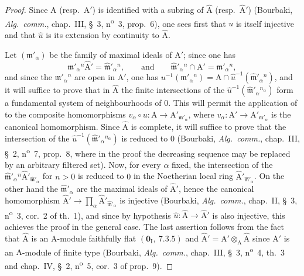 \begin{proof}
Since $\mathrm{A}$ (resp.\ $\mathrm{A}'$) is identified with a subring of $\hat{\mathrm{A}}$ (resp.\ $\hat{\mathrm{A}}'$) (Bourbaki,
\emph{Alg.\ comm.}, chap.~III, \S~3, n\textsuperscript{o}~3, prop.~6), one sees first that $u$ is itself injective
and that $\hat{u}$ is its extension by continuity to $\hat{\mathrm{A}}$.

Let $(\mathfrak{m}'_\alpha)$ be the family of maximal ideals of $\mathrm{A}'$; since one has
\[
\mathfrak{m}'_\alpha{}^n\hat{\mathrm{A}}'=\hat{\mathfrak{m}}'_\alpha{}^n, \qquad \text{and} \qquad \hat{\mathfrak{m}}'_\alpha{}^n\cap\mathrm{A}'=\mathfrak{m}'_\alpha{}^n,
\]
and since the $\mathfrak{m}'_\alpha{}^n$ are open in $\mathrm{A}'$, one has
$u^{-1}(\mathfrak{m}'_\alpha{}^n)=\mathrm{A}\cap\hat{u}^{-1}(\hat{\mathfrak{m}}'_\alpha{}^n)$, and it will suffice to prove that in
$\hat{\mathrm{A}}$ the finite intersections of the $\hat{u}^{-1}(\hat{\mathfrak{m}}'_\alpha{}^{n_\alpha})$ form a fundamental system of neighbourhoods
of $0$. This will permit the application of  to the composite homomorphisms
$v_\alpha\circ u:\mathrm{A}\to\mathrm{A}'_{\mathfrak{m}'_\alpha}$, where
$v_\alpha:\mathrm{A}'\to\mathrm{A}'_{\mathfrak{m}'_\alpha}$ is the canonical homomorphism. Since $\hat{\mathrm{A}}$ is complete, it will suffice to
prove that the intersection of the $\hat{u}^{-1}(\hat{\mathfrak{m}}'_\alpha{}^{n_\alpha})$ is reduced to $0$ (Bourbaki,
\emph{Alg.\ comm.}, chap.~III, \S~2, n\textsuperscript{o}~7, prop.~8, where in the proof the decreasing sequence may be replaced by an arbitrary
filtered set). Now, for every $\alpha$
fixed, the intersection of the $\hat{\mathfrak{m}}'_\alpha{}^n\hat{\mathrm{A}}'_{\hat{\mathfrak{m}}'_\alpha}$ for $n>0$ is reduced to $0$ in the
Noetherian local ring $\hat{\mathrm{A}}'_{\hat{\mathfrak{m}}'_\alpha}$.
On the other hand the $\hat{\mathfrak{m}}'_\alpha$ are the maximal ideals of $\hat{\mathrm{A}}'$, hence the canonical homomorphism
$\hat{\mathrm{A}}'\to\prod_\alpha\hat{\mathrm{A}}'_{\hat{\mathfrak{m}}'_\alpha}$ is injective (Bourbaki, \emph{Alg.\ comm.}, chap.~II, \S~3, n\textsuperscript{o}~3, cor.~2 of th.~1), and
since by hypothesis $\hat{u}:\hat{\mathrm{A}}\to\hat{\mathrm{A}}'$ is also injective, this achieves the proof in
the general case. The last assertion follows from the fact that $\hat{\mathrm{A}}$ is an $\mathrm{A}$-module faithfully
flat $(\mathbf{0}_\mathrm{I},~7.3.5)$ and $\hat{\mathrm{A}}'=\mathrm{A}'\otimes_\mathrm{A}\hat{\mathrm{A}}$ since $\mathrm{A}'$ is an $\mathrm{A}$-module of finite type
(Bourbaki, \emph{Alg.\ comm.}, chap.~III, \S~3, n\textsuperscript{o}~4, th.~3 and chap.~IV, \S~2, n\textsuperscript{o}~5, cor.~3 of prop.~9).
\end{proof}

